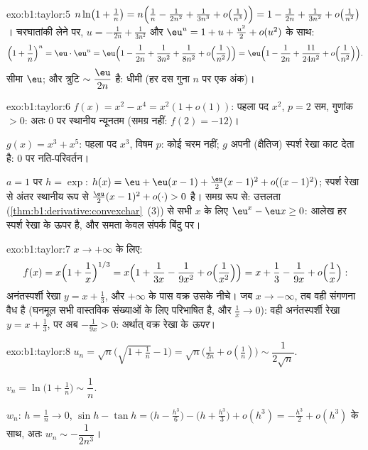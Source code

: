 \begin{solution}{exo:b1:taylor:5}
$n\ln\bigl(1 + \frac1n\bigr) = n\Bigl(\frac1n - \frac{1}{2n^2} +
\frac{1}{3n^3} + o\bigl(\frac{1}{n^3}\bigr)\Bigr) = 1 - \frac{1}{2n} +
\frac{1}{3n^2} + o\bigl(\frac{1}{n^2}\bigr)$। चरघातांकी लेने पर, $u =
-\frac{1}{2n} + \frac{1}{3n^2}$ और $\eu^u = 1 + u + \frac{u^2}2 + o(u^2)$ के
साथ:
\[
\Bigl(1 + \frac1n\Bigr)^n = \eu\cdot \eu^{u}
= \eu\Bigl(1 - \frac{1}{2n} + \frac{1}{3n^2} + \frac{1}{8n^2}
+ o\Bigl(\frac{1}{n^2}\Bigr)\Bigr)
= \eu\Bigl(1 - \frac{1}{2n} + \frac{11}{24n^2} +
o\Bigl(\frac{1}{n^2}\Bigr)\Bigr).
\]
सीमा $\eu$; और त्रुटि $\sim \dfrac{\eu}{2n}$ है: धीमी (हर दस गुना $n$ पर एक
अंक)।
\end{solution}

\begin{solution}{exo:b1:taylor:6}
$f(x) = x^2 - x^4 = x^2(1 + o(1))$: पहला पद $x^2$, $p = 2$ सम, गुणांक $> 0$:
अतः $0$ पर स्थानीय न्यूनतम (समग्र नहीं: $f(2) = -12$)।

$g(x) = x^3 + x^5$: पहला पद $x^3$, विषम $p$: कोई चरम नहीं; $g$ अपनी
(क्षैतिज) स्पर्श रेखा काट देता है: $0$ पर नति-परिवर्तन।

$a = 1$ पर $h = \exp$: $h(x) = \eu + \eu(x-1) + \frac{\eu}{2}(x-1)^2 +
o((x-1)^2)$; स्पर्श रेखा से अंतर स्थानीय रूप से $\frac{\eu}{2}(x-1)^2 +
o(\cdot) > 0$ है। समग्र रूप से: उत्तलता
(\cref{thm:b1:derivative:convexchar}~(3)) से सभी $x$ के लिए $\eu^x - \eu x
\geq 0$: आलेख हर स्पर्श रेखा के ऊपर है, और समता केवल संपर्क बिंदु पर।
\end{solution}

\begin{solution}{exo:b1:taylor:7}
$x \to +\infty$ के लिए:
\[
f(x) = x\Bigl(1 + \frac1x\Bigr)^{1/3}
= x\Bigl(1 + \frac{1}{3x} - \frac{1}{9x^2} +
o\Bigl(\frac{1}{x^2}\Bigr)\Bigr)
= x + \frac13 - \frac{1}{9x} + o\Bigl(\frac1x\Bigr):
\]
अनंतस्पर्शी रेखा $y = x + \frac13$, और $+\infty$ के पास वक्र उसके नीचे। जब
$x \to -\infty$, तब वही संगणना वैध है (घनमूल सभी वास्तविक संख्याओं के लिए
परिभाषित है, और $\frac1x \to 0$): वही अनंतस्पर्शी रेखा $y = x + \frac13$, पर
अब $-\frac{1}{9x} > 0$: अर्थात् वक्र रेखा के \emph{ऊपर}।
\end{solution}

\begin{solution}{exo:b1:taylor:8}
$u_n = \sqrt n\bigl(\sqrt{1 + \tfrac1n} - 1\bigr) = \sqrt
n\bigl(\frac{1}{2n} + o(\frac1n)\bigr) \sim \dfrac{1}{2\sqrt n}$.

$v_n = \ln\bigl(1 + \frac1n\bigr) \sim \dfrac 1n$.

$w_n$: $h = \frac1n \to 0$, $\sin h - \tan h = \bigl(h - \frac{h^3}{6}\bigr)
- \bigl(h + \frac{h^3}{3}\bigr) + o(h^3) = -\frac{h^3}{2} + o(h^3)$ के साथ,
अतः $w_n \sim -\dfrac{1}{2n^3}$।
\end{solution}

